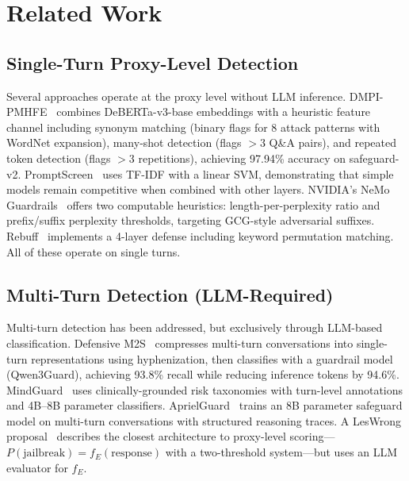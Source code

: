 \documentclass[11pt,a4paper]{article}
\begin{document}
\section{Related Work}
\label{sec:related}

\subsection{Single-Turn Proxy-Level Detection}

Several approaches operate at the proxy level without LLM inference.
DMPI-PMHFE~\cite{dmpipmhfe} combines DeBERTa-v3-base embeddings with a
heuristic feature channel including synonym matching (binary flags for 8
attack patterns with WordNet expansion), many-shot detection (flags
$>$3 Q\&A pairs), and repeated token detection (flags $>$3
repetitions), achieving 97.94\% accuracy on safeguard-v2.
PromptScreen~\cite{promptscreen} uses TF-IDF with a linear SVM,
demonstrating that simple models remain competitive when combined with
other layers. NVIDIA's NeMo Guardrails~\cite{nemoguardrails} offers two
computable heuristics: length-per-perplexity ratio and prefix/suffix
perplexity thresholds, targeting GCG-style adversarial suffixes.
Rebuff~\cite{rebuff} implements a 4-layer defense including keyword
permutation matching. All of these operate on single turns.

\subsection{Multi-Turn Detection (LLM-Required)}

Multi-turn detection has been addressed, but exclusively through
LLM-based classification. Defensive M2S~\cite{defensivem2s} compresses
multi-turn conversations into single-turn representations using
hyphenization, then classifies with a guardrail model (Qwen3Guard),
achieving 93.8\% recall while reducing inference tokens by 94.6\%.
MindGuard~\cite{mindguard} uses clinically-grounded risk taxonomies with
turn-level annotations and 4B--8B parameter classifiers.
AprielGuard~\cite{aprielguard} trains an 8B parameter safeguard model on
multi-turn conversations with structured reasoning traces. A LesWrong
proposal~\cite{leswrong} describes the closest architecture to
proxy-level scoring---$P(\text{jailbreak}) = f_E(\text{response})$ with
a two-threshold system---but uses an LLM evaluator for $f_E$.
\end{document}
